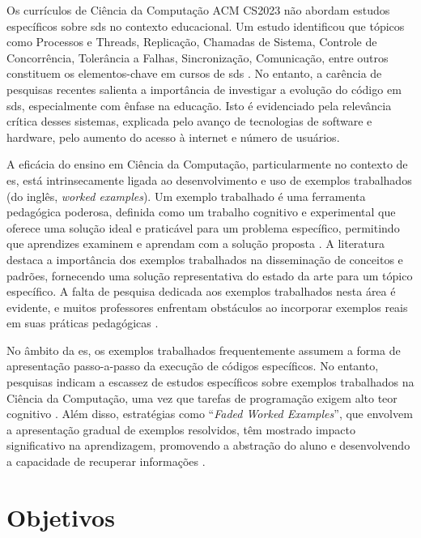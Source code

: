 Os currículos de Ciência da Computação ACM CS2023 \cite{CS2023:ACM} não abordam estudos específicos sobre \gls{sds} no contexto educacional. Um estudo identificou que tópicos como Processos e Threads, Replicação, Chamadas de Sistema, Controle de Concorrência, Tolerância a Falhas, Sincronização, Comunicação, entre outros constituem os elementos-chave em cursos de \gls{sds} \cite{HaveWeReachedConsensus}. No entanto, a carência de pesquisas recentes salienta a importância de investigar a evolução do código em \gls{sds}, especialmente com ênfase na educação. Isto é evidenciado pela relevância crítica desses sistemas, explicada pelo avanço de tecnologias de software e hardware, pelo aumento do acesso à internet e número de usuários.

A eficácia do ensino em Ciência da Computação, particularmente no contexto de \gls{es}, está intrinsecamente ligada ao desenvolvimento e uso de exemplos trabalhados (do inglês, \textit{worked examples}). Um exemplo trabalhado é uma ferramenta pedagógica poderosa, definida como um trabalho cognitivo e experimental que oferece uma solução ideal e praticável para um problema específico, permitindo que aprendizes examinem e aprendam com a solução proposta \cite{Robert.Atkinson-etal:2000}. A literatura destaca a importância dos exemplos trabalhados na disseminação de conceitos e padrões, fornecendo uma solução representativa do estado da arte para um tópico específico. A falta de pesquisa dedicada aos exemplos trabalhados nesta área é evidente, e muitos professores enfrentam obstáculos ao incorporar exemplos reais em suas práticas pedagógicas \cite{Simone.Tonhao-etal:2021}.

No âmbito da \gls{es}, os exemplos trabalhados frequentemente assumem a forma de apresentação passo-a-passo da execução de códigos específicos. No entanto, pesquisas indicam a escassez de estudos específicos sobre exemplos trabalhados na Ciência da Computação, uma vez que tarefas de programação exigem alto teor cognitivo \cite{Skudder-LuxtonReilly:2014}. Além disso, estratégias como ``\textit{Faded Worked Examples}'', que envolvem a apresentação gradual de exemplos resolvidos, têm mostrado impacto significativo na aprendizagem, promovendo a abstração do aluno e desenvolvendo a capacidade de recuperar informações \cite{Skudder-LuxtonReilly:2014}.

\section{Objetivos}\label{sec:objetivos}
